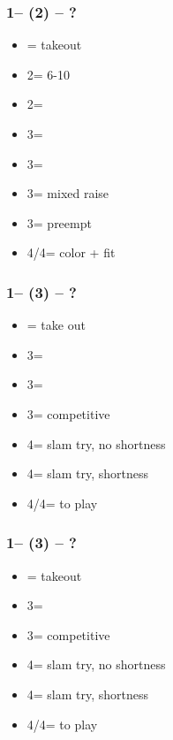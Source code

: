 \documentclass[12pt, a4paper]{report}
\begin{document}
{{{            \subsubsection*{1\spades -- (2\hearts) -- ?}
            \begin{itemize}
                \item \dbl = takeout
                \item 2\spades = 6-10
                \item 2\nt = \clubs\ \invp
                \item 3\clubs = \diams\ \invp
                \item 3\diams = \spades\ \invp
                \item 3\hearts = mixed raise
                \item 3\spades = preempt
                \item 4\clubs/4\diams = color + fit
            \end{itemize}

            \subsubsection*{1\spades -- (3\clubs) -- ?}
            \begin{itemize}
                \item \dbl = take out
                \item 3\diams = \hearts\ \invp
                \item 3\hearts = \spades\ \invp
                \item 3\spades = competitive
                \item 4\clubs = slam try, no \clubs shortness
                \item 4\diams = slam try, \clubs shortness
                \item 4\hearts/4\spades = to play
            \end{itemize}

            \subsubsection*{1\spades -- (3\diams) -- ?}
            \begin{itemize}
                \item \dbl = takeout
                \item 3\hearts = \hearts\ \gf
                \item 3\spades = competitive
                \item 4\clubs = slam try, no \diams shortness
                \item 4\diams = slam try, \diams shortness
                \item 4\hearts/4\spades = to play
            \end{itemize}

}}}
\end{document}
